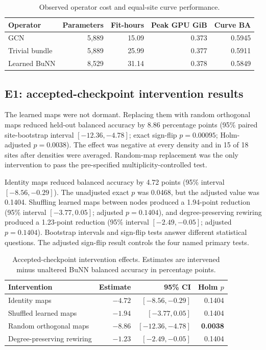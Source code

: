 \documentclass[11pt,a4paper]{article}
\begin{document}
\begin{table}[htbp]
\centering
\caption{Observed operator cost and equal-site curve performance.}
\label{tab:efficiency}
\small
\begin{tabularx}{\textwidth}{@{}Y r r r r@{}}
\toprule
\textbf{Operator} & \textbf{Parameters} & \textbf{Fit-hours} & \textbf{Peak GPU GiB} & \textbf{Curve BA} \\
\midrule
GCN & 5,889 & 15.09 & 0.373 & 0.5945 \\
Trivial bundle & 5,889 & 25.99 & 0.377 & 0.5911 \\
Learned BuNN & 8,529 & 31.14 & 0.378 & 0.5849 \\
\bottomrule
\end{tabularx}
\end{table}

\subsection{E1: accepted-checkpoint intervention results}

The learned maps were not dormant. Replacing them with random orthogonal maps
reduced held-out balanced accuracy by 8.86 percentage points (95\% paired
site-bootstrap interval $[-12.36,-4.78]$; exact sign-flip $p=0.00095$;
Holm-adjusted $p=0.0038$). The effect was negative at every density and in 15
of 18 sites after densities were averaged. Random-map replacement was the only
intervention to pass the pre-specified multiplicity-controlled test.

Identity maps reduced balanced accuracy by 4.72 points (95\% interval
$[-8.56,-0.29]$). The unadjusted exact $p$ was 0.0468, but the adjusted value
was 0.1404. Shuffling learned maps between nodes produced a 1.94-point
reduction (95\% interval $[-3.77,0.05]$; adjusted $p=0.1404$), and
degree-preserving rewiring produced a 1.23-point reduction (95\% interval
$[-2.49,-0.05]$; adjusted $p=0.1404$). Bootstrap intervals and sign-flip tests
answer different statistical questions. The adjusted sign-flip result controls
the four named primary tests.

\begin{table}[htbp]
\centering
\caption{Accepted-checkpoint intervention effects. Estimates are intervened
minus unaltered BuNN balanced accuracy in percentage points.}
\label{tab:e1-primary}
\small
\begin{tabularx}{\textwidth}{@{}Y r r r@{}}
\toprule
\textbf{Intervention} & \textbf{Estimate} & \textbf{95\% CI} & \textbf{Holm $p$} \\
\midrule
Identity maps & $-4.72$ & $[-8.56,-0.29]$ & 0.1404 \\
Shuffled learned maps & $-1.94$ & $[-3.77,0.05]$ & 0.1404 \\
Random orthogonal maps & $-8.86$ & $[-12.36,-4.78]$ & \textbf{0.0038} \\
Degree-preserving rewiring & $-1.23$ & $[-2.49,-0.05]$ & 0.1404 \\
\bottomrule
\end{tabularx}
\end{table}
\end{document}
